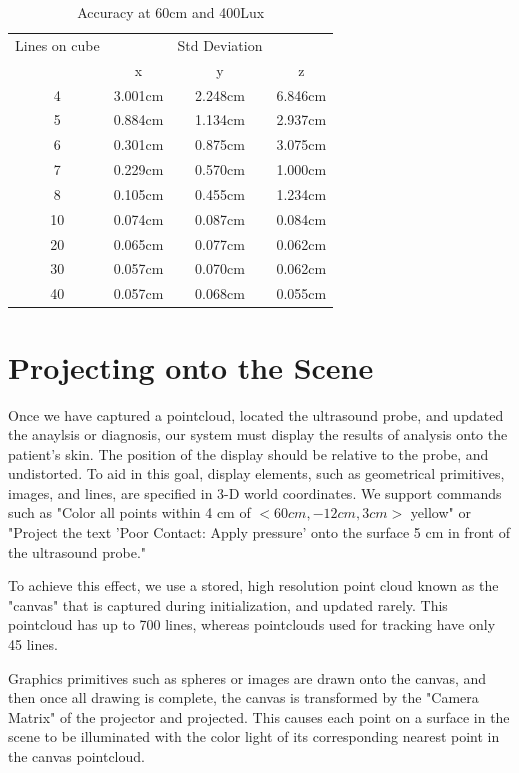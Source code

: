 \documentclass{llncs}
\begin{document}
\begin{table}
\caption{Accuracy at 60cm and 400Lux }
\begin{tabular}{c|ccc}
\hline
\hline
Lines on cube & & Std Deviation & \\
 & x & y & z\\
\hline
4  & 3.001cm & 2.248cm & 6.846cm\\
5  & 0.884cm & 1.134cm & 2.937cm\\
6  & 0.301cm & 0.875cm & 3.075cm\\
7  & 0.229cm & 0.570cm & 1.000cm\\
8  & 0.105cm & 0.455cm & 1.234cm\\
10 & 0.074cm & 0.087cm & 0.084cm\\
20 & 0.065cm & 0.077cm & 0.062cm\\
30 & 0.057cm & 0.070cm & 0.062cm\\
40 & 0.057cm & 0.068cm & 0.055cm\\
\hline

\end{tabular}
\centering
\end{table}


\section{Projecting onto the Scene}

Once we have captured a pointcloud, located the ultrasound probe, and updated the anaylsis or diagnosis, our system must display the results of analysis onto the patient's skin. The position of the display should be relative to the probe, and undistorted. To aid in this goal, display elements, such as geometrical primitives, images, and lines, are specified in 3-D world coordinates. We support commands such as "Color all points within 4 cm of $<60 cm, -12 cm, 3 cm>$ yellow" or "Project the text 'Poor Contact: Apply pressure' onto the surface 5 cm in front of the ultrasound probe."

To achieve this effect, we use a stored, high resolution point cloud known as the "canvas" that is captured during initialization, and updated rarely. This pointcloud has up to 700 lines, whereas pointclouds used for tracking have only 45 lines. 

Graphics primitives such as spheres or images are drawn onto the canvas, and then once all drawing is complete, the canvas is transformed by the "Camera Matrix" of the projector and projected. This causes each point on a surface in the scene to be illuminated with the color light of its corresponding nearest point in the canvas pointcloud. 
\end{document}
